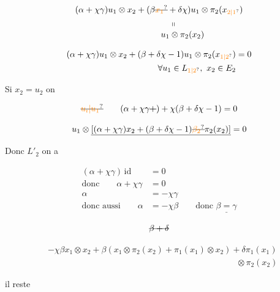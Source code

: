 \[
\begin{aligned}
&(\alpha+\chi\gamma)u_1\otimes x_2+(\beta\deleted{\unsure{x_1}}+\delta\chi)u_1\otimes\pi_2(x_{\unsure{2|1}})\\
&\hspace{11em}\shortparallel\\[-2pt]
&\hspace{10em}u_1\otimes\pi_2(x_2)
\end{aligned}
\]

\[
\begin{aligned}
(\alpha+\chi\gamma)u_1\otimes x_2+(\beta+\delta\chi-1)u_1\otimes\pi_2(x_{\unsure{1|2}})&=0\\
\forall u_1\in L_{\unsure{1|2}},\ x_2\in E_2&
\end{aligned}
\]

Si $x_2=u_2$ on 

\[\deleted{\unsure{u_i|u_1}}\qquad(\alpha+\chi\gamma\deleted{+})+\chi(\beta+\delta\chi-1)=0\]

\[u_1\otimes\underline{[(\alpha+\chi\gamma)x_2+(\beta+\delta\chi-1)\deleted{\unsure{\beta_2}}\pi_2(x_2)]}=0\]

Donc  $L'_2$ on a

\[
\begin{aligned}
(\alpha+\chi\gamma)\,\mathrm{id}&=0\\
\text{donc}\qquad \alpha+\chi\gamma&=0\\
\alpha&=-\chi\gamma\\
\text{donc aussi}\qquad \alpha&=-\chi\beta\qquad\text{donc }\underline{\beta=\gamma}
\end{aligned}
\]

\[\deleted{\beta+\delta}\]

\[
\begin{aligned}
&-\chi\beta x_1\otimes x_2+\beta(x_1\otimes\pi_2(x_2)+\pi_1(x_1)\otimes x_2)+\delta\pi_1(x_1)\\
&\hspace{22em}\otimes\pi_2(x_2)
\end{aligned}
\]

il reste 

